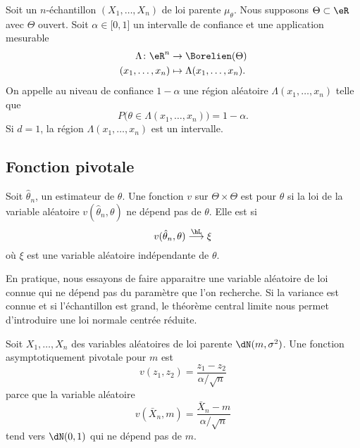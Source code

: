 Soit un \( n\)-échantillon \( (X_1,\ldots,X_n)\) de loi parente \( \mu_{\theta}\). Nous supposons \( \Theta\subset\eR\) avec \( \Theta\) ouvert. Soit \( \alpha\in\mathopen[ 0 , 1 \mathclose]\) un intervalle de confiance et une application mesurable
\begin{equation}
	\begin{aligned}
		\Lambda\colon \eR^n & \to \Borelien(\Theta)            \\
		(x_1,\ldots,x_n)    & \mapsto \Lambda(x_1,\ldots,x_n).
	\end{aligned}
\end{equation}
On appelle  au niveau de confiance \( 1-\alpha\) une région aléatoire \( \Lambda(x_1,\ldots,x_n)\) telle que
\begin{equation}
	P\big( \theta\in\Lambda(x_1,\ldots,x_n) \big)=1-\alpha.
\end{equation}
Si \( d=1\), la région \( \Lambda(x_1,\ldots,x_n)\) est un intervalle.

\subsection{Fonction pivotale}

Soit \( \hat\theta_n\), un estimateur de \( \theta\). Une fonction \( v\) sur \( \Theta\times\Theta\) est  pour \( \theta\) si la loi de la variable aléatoire \( v(\hat\theta_n,\theta)\) ne dépend pas de \( \theta\). Elle est  si
\begin{equation}
	v(\hat\theta_n,\theta)\stackrel{\hL}{\longrightarrow}\xi
\end{equation}
où \( \xi\) est une variable aléatoire indépendante de \( \theta\).

En pratique, nous essayons de faire apparaitre une variable aléatoire de loi connue qui ne dépend pas du paramètre que l'on recherche. Si la variance est connue et si l'échantillon est grand, le théorème central limite nous permet d'introduire une loi normale centrée réduite.

\begin{example}
	Soit \( X_1,\ldots,X_n\) des variables aléatoires de loi parente \( \dN(m,\sigma^2)\). Une fonction asymptotiquement pivotale pour \( m\) est
	\begin{equation}
		v(z_1,z_2)=\frac{ z_1-z_2 }{ \alpha/\sqrt{n} }
	\end{equation}
	parce que la variable aléatoire
	\begin{equation}
		v(\bar X_n,m)=\frac{ \bar X_n-m }{ \alpha/\sqrt{n} }
	\end{equation}
	tend vers \( \dN(0,1)\) qui ne dépend pas de \( m\).
\end{example}

